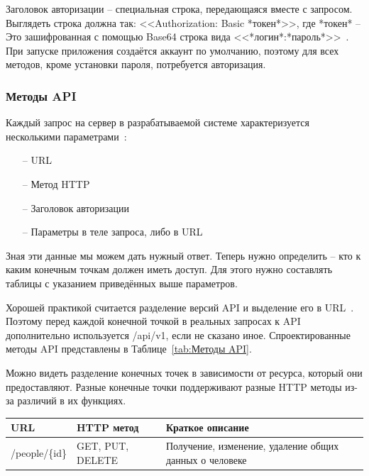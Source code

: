 \documentclass[a4paper,article]{article}
\begin{document}
\begin{sloppypar}
    Заголовок авторизации -- специальная строка, передающаяся вместе с запросом. Выглядеть строка должна так: <<Authorization: Basic *токен*>>, где *токен* -- Это зашифрованная с помощью Base64 строка вида <<*логин*:*пароль*>>~\cite{baeldungbook}. При запуске приложения создаётся аккаунт по умолчанию, поэтому для всех методов, кроме установки пароля, потребуется авторизация.

    \subsubsection{Методы API}

    Каждый запрос на сервер в разрабатываемой системе характеризуется несколькими параметрами~\cite{baeldungbook}:

    \begin{itemize}[nolistsep]
        \item[--] URL
        \item[--] Метод HTTP
        \item[--] Заголовок авторизации
        \item[--] Параметры в теле запроса, либо в URL
    \end{itemize}

    Зная эти данные мы можем дать нужный ответ. Теперь нужно определить -- кто к каким конечным точкам должен иметь доступ. Для этого нужно составлять таблицы с указанием приведённых выше параметров.

    Хорошей практикой считается разделение версий API и выделение его в URL~\cite{baeldungbook}. Поэтому перед каждой конечной точкой в реальных запросах к API дополнительно используется /api/v1, если не сказано иное. Спроектированные методы API представлены в Таблице~\ref{tab:Методы API}.
    
    Можно видеть разделение конечных точек в зависимости от ресурса, который они предоставляют. Разные конечные точки поддерживают разные HTTP методы из-за различий в их функциях.
    
    \newpage

    \begin{xltabular}{\textwidth} { |
        >{\hsize} X |
        >{\hsize} X |
        >{\hsize} X | }

        \hline
        URL & HTTP метод & Краткое описание \\

        \hline
        /people/\{id\}
        & GET, PUT, DELETE
        & Получение, изменение, удаление общих данных о человеке \\


\end{xltabular}
\end{sloppypar}
\end{document}
